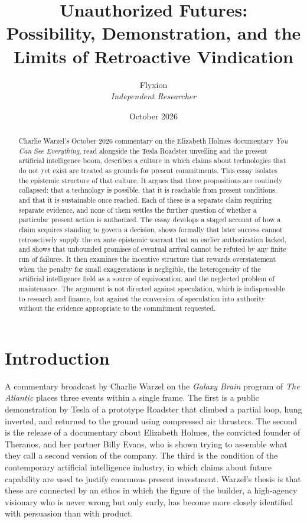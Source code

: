 \documentclass[11pt]{article}
\title{Unauthorized Futures:\\ Possibility, Demonstration, and the Limits of Retroactive Vindication}
\author{Flyxion\\ \textit{Independent Researcher}}
\date{October 2026}
\theoremstyle{plain}
\theoremstyle{definition}
\theoremstyle{remark}
\begin{document}
\maketitle

\begin{abstract}
\noindent
Charlie Warzel's October 2026 commentary on the Elizabeth Holmes documentary \textit{You Can See Everything}, read alongside the Tesla Roadster unveiling and the present artificial intelligence boom, describes a culture in which claims about technologies that do not yet exist are treated as grounds for present commitments. This essay isolates the epistemic structure of that culture. It argues that three propositions are routinely collapsed: that a technology is possible, that it is reachable from present conditions, and that it is sustainable once reached. Each of these is a separate claim requiring separate evidence, and none of them settles the further question of whether a particular present action is authorized. The essay develops a staged account of how a claim acquires standing to govern a decision, shows formally that later success cannot retroactively supply the ex ante epistemic warrant that an earlier authorization lacked, and shows that unbounded promises of eventual arrival cannot be refuted by any finite run of failures. It then examines the incentive structure that rewards overstatement when the penalty for small exaggerations is negligible, the heterogeneity of the artificial intelligence field as a source of equivocation, and the neglected problem of maintenance. The argument is not directed against speculation, which is indispensable to research and finance, but against the conversion of speculation into authority without the evidence appropriate to the commitment requested.
\end{abstract}

\section{Introduction}

A commentary broadcast by Charlie Warzel on the \textit{Galaxy Brain} program of \textit{The Atlantic} places three events within a single frame. The first is a public demonstration by Tesla of a prototype Roadster that climbed a partial loop, hung inverted, and returned to the ground using compressed air thrusters. The second is the release of a documentary about Elizabeth Holmes, the convicted founder of Theranos, and her partner Billy Evans, who is shown trying to assemble what they call a second version of the company. The third is the condition of the contemporary artificial intelligence industry, in which claims about future capability are used to justify enormous present investment. Warzel's thesis is that these are connected by an ethos in which the figure of the builder, a high-agency visionary who is never wrong but only early, has become more closely identified with persuasion than with product.
\end{document}
